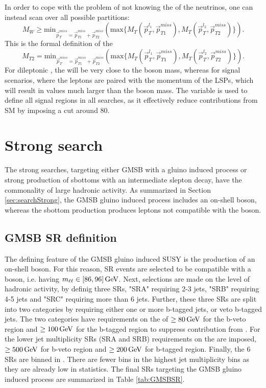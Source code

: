 In order to cope with the problem of not knowing the \pt of the neutrinos, one can instead scan over all possible \ptmiss partitions: 
\begin{equation}
M_{W}\geq \mathrm{min}_{\vec{p}_{T}^{miss}=\vec{p}_{T1}^{miss}+\vec{p}_{T2}^{miss}}\left( \mathrm{max}\{M_{T}\left(\vec{p}_{T}^{l_{1}},\vec{p}_{T1}^{miss}\right), M_{T}\left(\vec{p}_{T}^{l_{2}},\vec{p}_{T2}^{miss}\right)\}\right).
\end{equation}
This is the formal definition of the \mttwo 
\begin{equation}
M_{T2}= \mathrm{min}_{\vec{p}_{T}^{miss}=\vec{p}_{T1}^{miss}+\vec{p}_{T2}^{miss}}\left( \mathrm{max}\{M_{T}\left(\vec{p}_{T}^{l_{1}},\vec{p}_{T1}^{miss}\right), M_{T}\left(\vec{p}_{T}^{l_{2}},\vec{p}_{T2}^{miss}\right)\}\right).
\end{equation}
For dileptonic \ttbar, the \mttwo will be very close to the \PW boson mass, whereas for signal scenarios, where the leptons are paired with the momentum of the LSPs, which will result in values much larger than the \PW boson mass. 
The \mttwo variable is used to define all signal regions in all searches, as it effectively reduce contributions from SM \ttbar by imposing a cut around 80\GeV.
\section{Strong search} 
The strong searches, targeting either GMSB with a gluino induced process or strong production of sbottoms with an intermediate slepton decay, have the commonality of large hadronic activity. 
As summarized in Section \ref{sec:searchStrong}, the GMSB gluino induced process includes an on-shell \PZ boson, whereas the sbottom production produces leptons not compatible with the \PZ boson. 
\subsection{GMSB SR definition}
The defining feature of the GMSB gluino induced SUSY is the production of an on-shell \PZ boson. 
For this reason, SR events are selected to be compatible with a \PZ boson, i.e. having $m_{\ell\ell}\in[86,96]\,\text{Ge\hspace{-.08em}V}$. 
Next, selections are made on the level of hadronic activity, by definig three SRs, "SRA" requiring 2-3 jets, "SRB" requiring 4-5 jets and "SRC" requiring more than 6 jets. 
Further, these three SRs are split into two categories by requiring either one or more b-tagged jets, or veto b-tagged jets. 
The two categories have requirements on the \mttwo of $\geq80\,\text{Ge\hspace{-.08em}V}$ for the b-veto region and $\geq100\,\text{Ge\hspace{-.08em}V}$ for the b-tagged region to suppress contribution from \ttbar.
For the lower jet multiplicity SRs (SRA and SRB) requirements on the \HT are imposed, $\geq500\,\text{Ge\hspace{-.08em}V}$ for b-veto region and $\geq200\,\text{Ge\hspace{-.08em}V}$ for b-tagged region. 
Finally, the 6 SRs are binned in \ptmiss. There are fewer \ptmiss bins in the highest jet multiplicity bins as they are already low in statistics. 
The final SRs targeting the GMSB gluino induced process are summarized in Table \ref{tab:GMSBSR}. 

